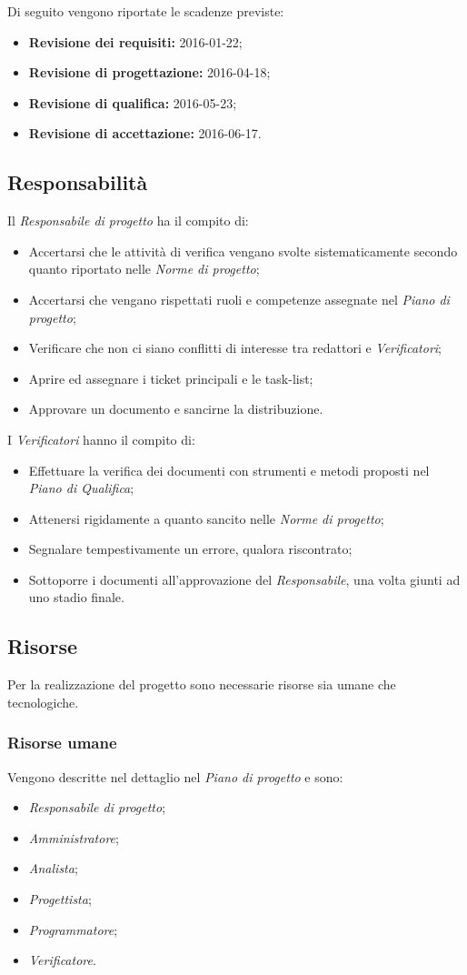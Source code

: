 \documentclass[a4paper]{article}
\begin{document}
			Di seguito vengono riportate le scadenze previste:
			\begin{itemize}
				\item \textbf{Revisione dei requisiti:} 2016-01-22;
				\item \textbf{Revisione di progettazione:} 2016-04-18;
				\item \textbf{Revisione di qualifica:} 2016-05-23;
				\item \textbf{Revisione di accettazione:} 2016-06-17.
			\end{itemize}
		\subsection{Responsabilità}
			Il \emph{Responsabile di progetto} ha il compito di:
			\begin{itemize}
				\item Accertarsi che le attività di verifica vengano svolte sistematicamente secondo quanto 
				riportato nelle \emph{Norme di progetto};
				\item Accertarsi che vengano rispettati ruoli e competenze assegnate nel \emph{Piano di progetto};
				\item Verificare che non ci siano conflitti di interesse tra redattori e \emph{Verificatori};
				\item Aprire ed assegnare i ticket principali e le task-list;
				\item Approvare un documento e sancirne la distribuzione.
			\end{itemize}
			I \emph{Verificatori} hanno il compito di:
			\begin{itemize}
				\item Effettuare la verifica dei documenti con strumenti e metodi proposti nel \emph{Piano di Qualifica};
				\item Attenersi rigidamente a quanto sancito nelle \emph{Norme di progetto};
				\item Segnalare tempestivamente un errore, qualora riscontrato;
				\item Sottoporre i documenti all'approvazione del \emph{Responsabile}, una volta giunti ad uno stadio finale.
			\end{itemize}
		\subsection{Risorse}
			Per la realizzazione del progetto sono necessarie risorse sia umane che tecnologiche.
			\subsubsection{Risorse umane}
				Vengono descritte nel dettaglio nel \emph{Piano di progetto} e sono:
				\begin{itemize}
					\item \emph{Responsabile di progetto};
					\item \emph{Amministratore};
					\item \emph{Analista};
					\item \emph{Progettista};
					\item \emph{Programmatore};
					\item \emph{Verificatore}.
				\end{itemize}
\end{document}
